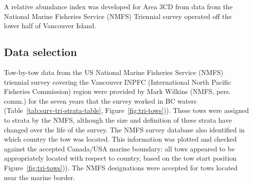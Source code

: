 \documentclass[11pt]{book}
\begin{document}
\hypertarget{nmfs-triennial-survey-in-canadian-waters}{%
\label{nmfs-triennial-survey-in-canadian-waters}}

A relative abundance index was developed for Area 3CD from data from the National Marine Fisheries Service (NMFS) Triennial survey operated off the lower half of Vancouver Island.

\hypertarget{data-selection}{%
\subsection{Data selection}\label{data-selection}}

Tow-by-tow data from the US National Marine Fisheries Service (NMFS) triennial survey covering the Vancouver INPFC (International North Pacific Fisheries Commission) region were provided by Mark Wilkins (NMFS, pers. comm.) for the seven years that the survey worked in BC waters (Table~\ref{tab:surv-tri-strata-table}, Figure~\ref{fig:tri-tows})). These tows were assigned to strata by the NMFS, although the size and definition of these strata have changed over the life of the survey. The NMFS survey database also identified in which country the tow was located. This information was plotted and checked against the accepted Canada/USA marine boundary: all tows appeared to be appropriately located with respect to country, based on the tow start position Figure~\ref{fig:tri-tows})). The NMFS designations were accepted for tows located near the marine border.
\end{document}
